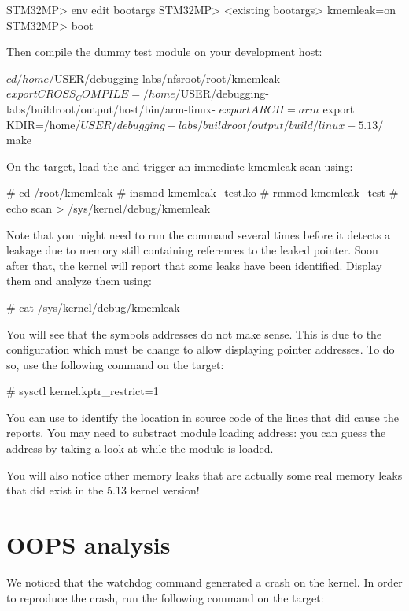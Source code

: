 \begin{bashinput}
STM32MP> env edit bootargs
STM32MP> <existing bootargs> kmemleak=on
STM32MP> boot
\end{bashinput}

Then compile the dummy test module on your development host:

\begin{bashinput}
$ cd /home/$USER/debugging-labs/nfsroot/root/kmemleak
$ export CROSS_COMPILE=/home/$USER/debugging-labs/buildroot/output/host/bin/arm-linux-
$ export ARCH=arm
$ export KDIR=/home/$USER/debugging-labs/buildroot/output/build/linux-5.13/
$ make
\end{bashinput}

On the target, load the  and trigger an immediate
kmemleak scan using:

\begin{bashinput}
# cd /root/kmemleak
# insmod kmemleak_test.ko
# rmmod kmemleak_test
# echo scan > /sys/kernel/debug/kmemleak
\end{bashinput}

Note that you might need to run the  command several times
before it detects a leakage due to memory still containing references to
the leaked pointer. Soon after that, the kernel will report that some leaks
have been identified. Display them and analyze them using:

\begin{bashinput}
# cat /sys/kernel/debug/kmemleak
\end{bashinput}

You will see that the symbols addresses do not make sense. This is due to the
 configuration which must be change to allow displaying
pointer addresses. To do so, use the following command on the target:

\begin{bashinput}
# sysctl kernel.kptr_restrict=1
\end{bashinput}

You can use  to identify the location in source code of the
lines that did cause the reports. You may need to substract module loading address:
you can guess the address by taking a look at  while the module
is loaded.

You will also notice other memory leaks that are actually some real memory leaks
that did exist in the 5.13 kernel version!

\section{OOPS analysis}
We noticed that the watchdog command generated a crash on the kernel. In order
to reproduce the crash, run the following command on the target:

